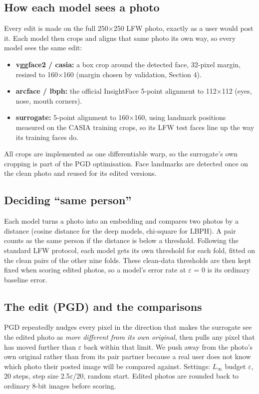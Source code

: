 \documentclass[10pt,a4paper]{article}
\begin{document}
\subsection{How each model sees a photo}

Every edit is made on the full 250$\times$250 LFW photo, exactly as a user would post it. Each model then crops and aligns that same photo its own way, so every model sees the same edit:


\begin{itemize}
  \item  \textbf{vggface2 / casia:} a box crop around the detected face, 32-pixel margin, resized to 160$\times$160 (margin chosen by validation, Section 4).
  \item  \textbf{arcface / lbph:} the official InsightFace 5-point alignment to 112$\times$112 (eyes, nose, mouth corners).
  \item  \textbf{surrogate:} 5-point alignment to 160$\times$160, using landmark positions measured on the CASIA training crops, so its LFW test faces line up the way its training faces do.
\end{itemize}

All crops are implemented as one differentiable warp, so the surrogate's own cropping is part of the PGD optimisation. Face landmarks are detected once on the clean photo and reused for its edited versions.


\subsection{Deciding ``same person''}

Each model turns a photo into an embedding and compares two photos by a distance (cosine distance for the deep models, chi-square for LBPH). A pair counts as the same person if the distance is below a threshold. Following the standard LFW protocol, each model gets its own threshold for each fold, fitted on the clean pairs of the other nine folds. These clean-data thresholds are then kept fixed when scoring edited photos, so a model's error rate at $\varepsilon$ = 0 is its ordinary baseline error.


\subsection{The edit (PGD) and the comparisons}

PGD repeatedly nudges every pixel in the direction that makes the surrogate see the edited photo as \emph{more different from its own original}, then pulls any pixel that has moved further than $\varepsilon$ back within that limit. We push away from the photo's own original rather than from its pair partner because a real user does not know which photo their posted image will be compared against. Settings: $L_\infty$ budget $\varepsilon$, 20 steps, step size 2.5$\varepsilon$/20, random start. Edited photos are rounded back to ordinary 8-bit images before scoring.
\end{document}
